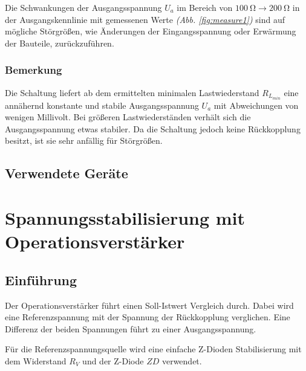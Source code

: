 \documentclass[a4paper]{hitec}
\begin{document}
Die Schwankungen der Ausgangsspannung $U_{a}$ im Bereich von $\qty{100}{\ohm} \to \qty{200}{\ohm}$ in der Ausgangskennlinie mit gemessenen Werte \textit{(Abb. \ref{fig:measure1})} sind auf mögliche Störgrößen, wie Änderungen der Eingangsspannung oder Erwärmung der Bauteile, zurückzuführen.

\subsubsection{Bemerkung}

Die Schaltung liefert ab dem ermittelten minimalen Lastwiederstand $R_{L_{min}}$ eine annähernd konstante und stabile Ausgangsspannung $U_{a}$ mit Abweichungen von wenigen Millivolt.
Bei größeren Lastwiederständen verhält sich die Ausgangsspannung etwas stabiler.
Da die Schaltung jedoch keine Rückkopplung besitzt, ist sie sehr anfällig für Störgrößen.

\subsection{Verwendete Geräte}

\medskip

\begin{devicelist}
\end{devicelist}

\clearpage

\section{Spannungsstabilisierung mit Operationsverstärker}

\subsection{Einführung}

Der Operationsverstärker führt einen Soll-Istwert Vergleich durch. Dabei wird eine Referenzspannung mit der Spannung der Rückkopplung verglichen.
Eine Differenz der beiden Spannungen führt zu einer Ausgangsspannung.  

Für die Referenzspannungsquelle wird eine einfache Z-Dioden Stabilisierung mit dem Widerstand $R_{V}$ und der Z-Diode $ZD$ verwendet.
\end{document}
